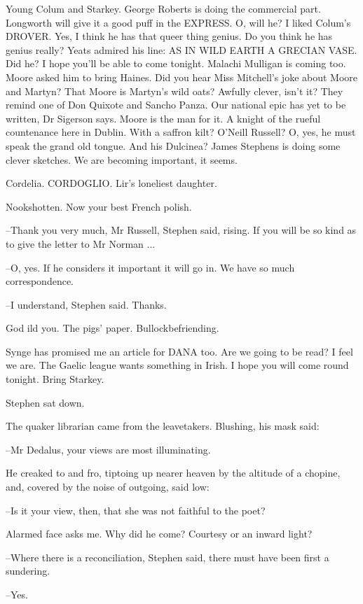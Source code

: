Young Colum and Starkey.
George Roberts is doing the commercial part.
Longworth will give it a good puff in the EXPRESS.
O,
will he?
I liked Colum's DROVER.
Yes,
I think he has that queer thing genius.
Do you think he has genius really?
Yeats admired his line:
AS IN WILD EARTH A GRECIAN VASE.
Did he?
I hope you'll be able to come tonight.
Malachi Mulligan is coming too.
Moore asked him to bring Haines.
Did you hear Miss Mitchell's joke about Moore and Martyn?
That Moore is Martyn's wild oats?
Awfully clever,
isn't it?
They remind one of Don Quixote and Sancho Panza.
Our national epic has yet to be written,
Dr Sigerson says.
Moore is the man for it.
A knight of the rueful countenance here in Dublin.
With a saffron kilt?
O'Neill Russell?
O, yes,
he must speak the grand old tongue.
And his Dulcinea?
James Stephens is doing some clever sketches.
We are becoming important,
it seems.

Cordelia.
CORDOGLIO.
Lir's loneliest daughter.

Nookshotten.
Now your best French polish.

--Thank you very much,
Mr Russell,
Stephen said, rising.
If you will be so kind as to give the letter to Mr Norman ...

--O, yes.
If he considers it important it will go in.
We have so much correspondence.

--I understand,
Stephen said.
Thanks.

God ild you.
The pigs' paper.
Bullockbefriending.

Synge has promised me an article for DANA too.
Are we going to be read?
I feel we are.
The Gaelic league wants something in Irish.
I hope you will come round tonight.
Bring Starkey.

Stephen sat down.

The quaker librarian came from the leavetakers.
Blushing,
his mask said:

--Mr Dedalus,
your views are most illuminating.

He creaked to and fro,
tiptoing up nearer heaven by the altitude of a chopine,
and,
covered by the noise of outgoing,
said low:

--Is it your view,
then,
that she was not faithful to the poet?

Alarmed face asks me.
Why did he come?
Courtesy or an inward light?

--Where there is a reconciliation,
Stephen said,
there must have been first a sundering.

--Yes.

